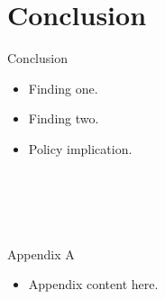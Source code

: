 \documentclass[notes=hide,subsection=false]{beamer}
\makeatletter
\def\beamer@writeslidentry@miniframesoff{%
    \expandafter\beamer@ifempty\expandafter{\beamer@framestartpage}{}%
    {%
        \clearpage\beamer@notesactions%
    }
}
\newcommand*{\miniframesoff}{\let\beamer@writeslidentry=\beamer@writeslidentry@miniframesoff}
\makeatother
\begin{document}
\section{Conclusion}

\begin{frame}{Conclusion}
    \begin{itemize}
        \item<+-> Finding one.
        \item<+-> Finding two.
        \item<+-> Policy implication.
    \end{itemize}
\end{frame}

\miniframesoff
\section{~}


\begin{frame}[label=appendix-a]{Appendix A}
    \begin{itemize}
        \item Appendix content here.
    \end{itemize}
\end{frame}
\end{document}
